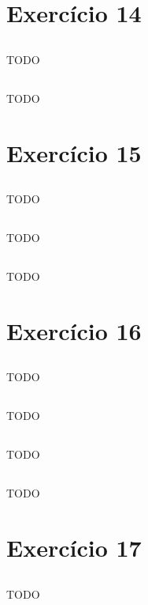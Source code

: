 \documentclass{article}
\begin{document}
\section{Exercício 14}
\subsection{}
TODO
\subsection{}
TODO

\section{Exercício 15}
\subsection{}
TODO
\subsection{}
TODO
\subsection{}
TODO

\section{Exercício 16}
\subsection{}
TODO
\subsection{}
TODO
\subsection{}
TODO
\subsection{}
TODO

\section{Exercício 17}
\subsection{}
TODO
\end{document}
